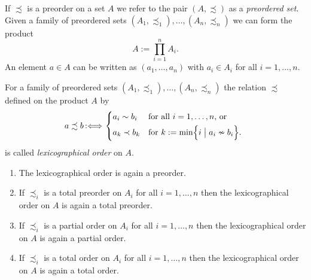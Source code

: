 ﻿\documentclass[a4paper,11pt,final]{article}
\newcommand{\defby}{\mbox{\ensuremath{\,:\Longleftrightarrow\,}}\xspace}
\numberwithin{equation}{subsection}
\begin{document}
If $\precsim$ is a preorder on a set $A$ we refer to the pair $(A,\precsim)$ as a \emph{preordered set}. Given a family of preordered sets $(A_1,\precsim_1),\dotsc,(A_n,\precsim_n)$ we can form the product
\begin{equation*}
A:=\prod_{i=1}^n A_i.
\end{equation*}
An element $a\in A$ can be written as $(a_1,\dotsc,a_n)$ with $a_i\in A_i$ for all $i=1,\dotsc,n$.

\begin{defi}\label{lexorder}
For a family of preordered sets $(A_1,\precsim_1),\dotsc,(A_n,\precsim_n)$ the relation $\precsim$ defined on the product $A$ by
\begin{equation*}
a \precsim b\defby \begin{dcases*}
a_i \sim b_i & for all $i=1,\dotsc,n$, or\\
a_k \prec b_k & for $k:=\min\Bigl\{i\bigm| a_i\nsim b_i\Bigr\}$.
\end{dcases*}
\end{equation*}
is called \emph{lexicographical order} on $A$.
\end{defi}

\begin{prop}
\begin{enumerate}
\item The lexicographical order is again a preorder.
\item If $\precsim_i$ is a total preorder on $A_i$ for all $i=1,\dotsc,n$ then the lexicographical order on $A$ is again a total preorder.
\item If $\precsim_i$ is a partial order on $A_i$ for all $i=1,\dotsc,n$ then the lexicographical order on $A$ is again a partial order.
\item If $\precsim_i$ is a total order on $A_i$ for all $i=1,\dotsc,n$ then the lexicographical order on $A$ is again a total order.
\end{enumerate}
\end{prop}
\end{document}

